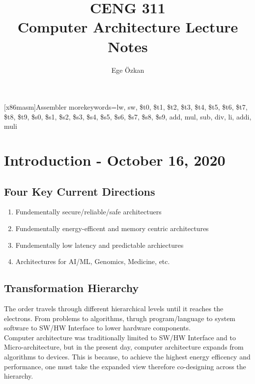\documentclass[11pt,a4paper,twocolumn]{book}
\author{Ege Özkan}
\title{CENG 311 \\ \large{Computer Architecture Lecture Notes}}
\begin{document}
\newcommand{\code}[1]{\texttt{#1}}
\newcommand{\cputime}{\ensuremath{\text{CPU Time}}}
\newcommand{\cyclecount}{\text{Cycle Count}}
\newcommand{\cycletime}{\text{Cycle Time}}
\newcommand{\clockrate}{\text{Clock Rate}}
\maketitle
\newcommand{\inscount}{\text{IC}}
\newcommand{\missed}{\textit{!*}}
   [x86masm]{Assembler} %
   {morekeywords={lw, sw, \$t0, \$t1,
   \$t2, \$t3, \$t4, \$t5, \$t6, \$t7,
   \$t8, \$t9, \$s0, \$s1, \$s2, \$s3,
   \$s4, \$s5, \$s6, \$s7, \$s8, \$s9,
   add, mul, sub, div,
   li, addi, muli}} %


\lstset{language=[MISP]Assembler}

\chapter{Introduction - October 16, 2020}

\section{Four Key Current Directions}

\begin{enumerate}
\item Fundementally secure/reliable/safe architectuers
\item Fundementally energy-efficent and memory centric architectures
\item Fundementally low latency and predictable archiectures
\item Architectures for AI/ML, Genomics, Medicine, etc.
\end{enumerate}

\section{Transformation Hierarchy}

The order travels through different hierarchical levels until it reaches the electrons. From problems to algorithms, thrugh program/language to system software to SW/HW Interface to lower hardware components.\\

Computer architecture was traditionally limited to SW/HW Interface and to Micro-architecture, but in the present day, computer architecture expands from algorithms to devices. This is because, to achieve the highest energy efficency and performance, one must take the expanded view therefore co-designing across the hierarchy.\\
\end{document}

